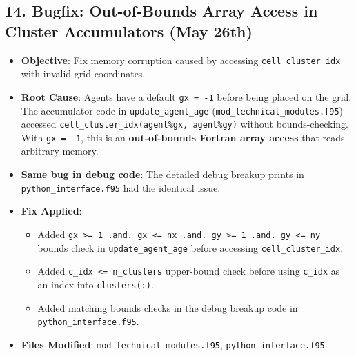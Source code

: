 \subsection{14. Bugfix: Out-of-Bounds Array Access in Cluster Accumulators (May 26th)}
\begin{itemize}
\item \textbf{Objective}: Fix memory corruption caused by accessing \texttt{cell\_cluster\_idx} with invalid grid coordinates.
\item \textbf{Root Cause}: Agents have a default \texttt{gx = -1} before being placed on the grid. The accumulator code in \texttt{update\_agent\_age} (\texttt{mod\_technical\_modules.f95}) accessed \texttt{cell\_cluster\_idx(agent\%gx, agent\%gy)} without bounds-checking. With \texttt{gx = -1}, this is an \textbf{out-of-bounds Fortran array access} that reads arbitrary memory.
\item \textbf{Same bug in debug code}: The detailed debug breakup prints in \texttt{python\_interface.f95} had the identical issue.
\item \textbf{Fix Applied}:
\begin{itemize}
\item Added \texttt{gx >= 1 .and. gx <= nx .and. gy >= 1 .and. gy <= ny} bounds check in \texttt{update\_agent\_age} before accessing \texttt{cell\_cluster\_idx}.
\item Added \texttt{c\_idx <= n\_clusters} upper-bound check before using \texttt{c\_idx} as an index into \texttt{clusters(:)}.
\item Added matching bounds checks in the debug breakup code in \texttt{python\_interface.f95}.
\end{itemize}
\item \textbf{Files Modified}: \texttt{mod\_technical\_modules.f95}, \texttt{python\_interface.f95}.
\end{itemize}

